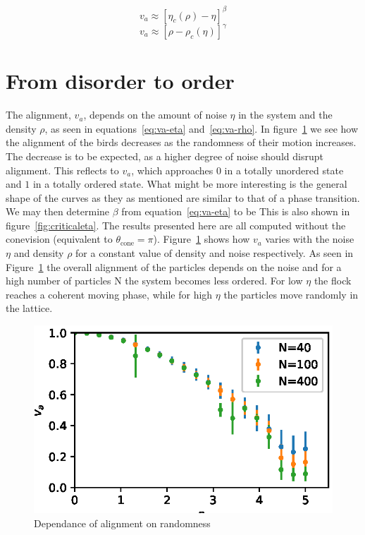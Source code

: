 \documentclass[twoside,twocolumn]{article}
\begin{document}
\begin{equation}
  \label{eq:va-eta}
  v_a \approx{[\eta_c(\rho)-\eta]}^\beta 
\end{equation}
\begin{equation}
  \label{eq:va-rho}
  v_a \approx{\left[\rho-\rho_c (\eta)\right]}^\gamma
\end{equation}



\section{From disorder to order}

The alignment, $v_a$, depends on the amount of noise $\eta$ in the system 
and the density $\rho$, as seen in equations~\eqref{eq:va-eta} and~\eqref{eq:va-rho}.
In figure~\ref{fig:va_over_eta} we see how the alignment of 
the birds decreases as the randomness of their motion increases. The decrease 
is to be expected, as a higher degree of noise should disrupt alignment. 
This reflects to $v_a$, which approaches $0$ in a totally unordered state and $1$
in a totally ordered state.
What might be more interesting is the general shape of the curves as they as mentioned are similar to
that of a phase transition. We may then 
determine $\beta$ from equation~\eqref{eq:va-eta} to be 
This is also shown in figure~\ref{fig:criticaleta}. The results presented here 
are all computed without the conevision (equivalent to $\theta_{\text{cone}} = \pi$). 
Figure~\ref{fig:va_over_eta} shows how $v_a$ varies with the noise $\eta$ and 
density $\rho$ for a constant value of density and noise respectively.
As seen in Figure~\ref{fig:va_over_eta} the overall alignment of the particles depends 
on the noise and for a high number of particles N the system becomes less ordered. 
For low $\eta$ the flock reaches a coherent moving phase, while for high $\eta$ 
the particles move randomly in the lattice.  


\begin{figure}[!htb]
  \centering
  \includegraphics[width=\columnwidth]{va_over_eta}
  \caption{Dependance of alignment on randomness}\label{fig:va_over_eta}
\end{figure}
\end{document}
